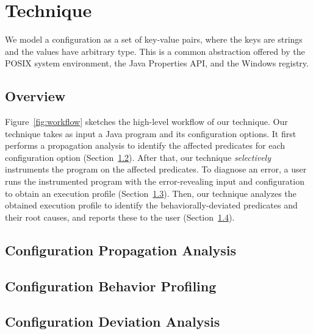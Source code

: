 \section{Technique}
\label{sec:technique}

We model a configuration as a set of key-value pairs, where
the keys are strings and the values have arbitrary type. This is
a common abstraction offered
by the POSIX system environment, the Java Properties API,
and the Windows registry.


\subsection{Overview}

Figure~\ref{fig:workflow} sketches the high-level workflow of our technique.
Our technique takes as input a Java program and its configuration options.
It first performs a propagation analysis to identify
the affected predicates for each configuration option (Section~\ref{sec:prop}).
After that, our technique \textit{selectively} instruments
the program on the affected predicates. 
To diagnose an error, a user runs the instrumented program
with the error-revealing input and configuration
to obtain an execution profile (Section~\ref{sec:profiling}).
Then, our technique analyzes the obtained execution profile
to identify the behaviorally-deviated predicates and their
root causes, and reports these to the user (Section~\ref{sec:analysis}).




\subsection{Configuration Propagation Analysis}
\label{sec:prop}


\subsection{Configuration Behavior Profiling}
\label{sec:profiling}



\subsection{Configuration Deviation Analysis}
\label{sec:analysis}



